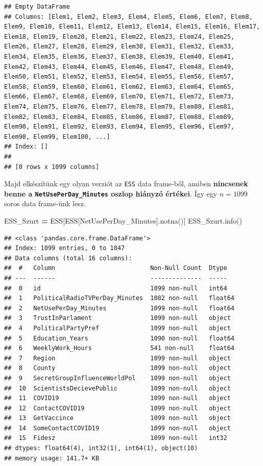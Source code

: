 \documentclass[
]{book}
\newenvironment{Shaded}{\begin{snugshade}}{\end{snugshade}}
\newcommand{\NormalTok}[1]{#1}
\newcommand{\OperatorTok}[1]{\textcolor[rgb]{0.81,0.36,0.00}{\textbf{#1}}}
\newcommand{\StringTok}[1]{\textcolor[rgb]{0.31,0.60,0.02}{#1}}
\begin{document}
\begin{verbatim}
## Empty DataFrame
## Columns: [Elem1, Elem2, Elem3, Elem4, Elem5, Elem6, Elem7, Elem8, Elem9, Elem10, Elem11, Elem12, Elem13, Elem14, Elem15, Elem16, Elem17, Elem18, Elem19, Elem20, Elem21, Elem22, Elem23, Elem24, Elem25, Elem26, Elem27, Elem28, Elem29, Elem30, Elem31, Elem32, Elem33, Elem34, Elem35, Elem36, Elem37, Elem38, Elem39, Elem40, Elem41, Elem42, Elem43, Elem44, Elem45, Elem46, Elem47, Elem48, Elem49, Elem50, Elem51, Elem52, Elem53, Elem54, Elem55, Elem56, Elem57, Elem58, Elem59, Elem60, Elem61, Elem62, Elem63, Elem64, Elem65, Elem66, Elem67, Elem68, Elem69, Elem70, Elem71, Elem72, Elem73, Elem74, Elem75, Elem76, Elem77, Elem78, Elem79, Elem80, Elem81, Elem82, Elem83, Elem84, Elem85, Elem86, Elem87, Elem88, Elem89, Elem90, Elem91, Elem92, Elem93, Elem94, Elem95, Elem96, Elem97, Elem98, Elem99, Elem100, ...]
## Index: []
## 
## [0 rows x 1099 columns]
\end{verbatim}

Majd elkészítünk egy olyan verziót az \texttt{ESS} data frame-ből, amiben \textbf{nincsenek benne a \texttt{NetUsePerDay\_Minutes} oszlop hiányzó értékei}. Így egy \(n=1099\) soros data frame-ünk lesz.

\begin{Shaded}
\begin{Highlighting}[]
\NormalTok{ESS\_Szurt }\OperatorTok{=}\NormalTok{ ESS[ESS[}\StringTok{\textquotesingle{}NetUsePerDay\_Minutes\textquotesingle{}}\NormalTok{].notna()]}
\NormalTok{ESS\_Szurt.info()}
\end{Highlighting}
\end{Shaded}

\begin{verbatim}
## <class 'pandas.core.frame.DataFrame'>
## Index: 1099 entries, 0 to 1847
## Data columns (total 16 columns):
##  #   Column                          Non-Null Count  Dtype  
## ---  ------                          --------------  -----  
##  0   id                              1099 non-null   int64  
##  1   PoliticalRadioTVPerDay_Minutes  1082 non-null   float64
##  2   NetUsePerDay_Minutes            1099 non-null   float64
##  3   TrustInParlament                1099 non-null   object 
##  4   PoliticalPartyPref              1099 non-null   object 
##  5   Education_Years                 1090 non-null   float64
##  6   WeeklyWork_Hours                541 non-null    float64
##  7   Region                          1099 non-null   object 
##  8   County                          1099 non-null   object 
##  9   SecretGroupInfluenceWorldPol    1099 non-null   object 
##  10  ScientistsDecievePublic         1099 non-null   object 
##  11  COVID19                         1099 non-null   object 
##  12  ContactCOVID19                  1099 non-null   object 
##  13  GetVaccince                     1099 non-null   object 
##  14  SomeContactCOVID19              1099 non-null   object 
##  15  Fidesz                          1099 non-null   int32  
## dtypes: float64(4), int32(1), int64(1), object(10)
## memory usage: 141.7+ KB
\end{verbatim}
\end{document}
